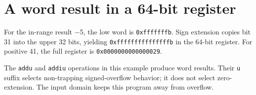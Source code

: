 \section{A word result in a 64-bit
  register}\label{001-console-calculation-x-width-a-word-result-in-a-64-bit-register}

For the in-range result \ensuremath{-}5, the low word is \texttt{0xfffffffb}. Sign
extension copies bit 31 into the upper 32 bits, yielding
\texttt{0xfffffffffffffffb} in the 64-bit register. For positive 41, the
full register is \texttt{0x0000000000000029}.

The \texttt{addu} and \texttt{addiu} operations in this example produce
word results. Their \texttt{u} suffix selects non-trapping
signed-overflow behavior; it does not select zero-extension. The input
domain keeps this program away from overflow.
